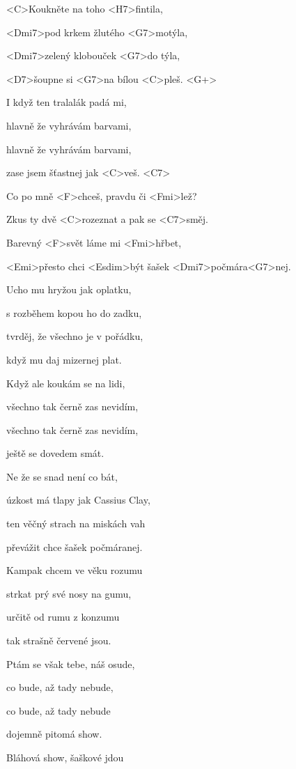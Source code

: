 

\zs
<C>Koukněte na toho <H7>fintila,

<Dmi7>pod krkem žlutého <G7>motýla,

<Dmi7>zelený klobouček <G7>do týla,

<D7>šoupne si <G7>na bílou <C>pleš. <G+>
\ks

\zs
I když ten tralalák padá mi,

hlavně že vyhrávám barvami,

hlavně že vyhrávám barvami,

zase jsem šťastnej jak <C>veš. <C7>
\ks

\zr
Co po mně <F>chceš, pravdu či <Fmi>lež?

Zkus ty dvě <C>rozeznat a pak se <C7>směj.

Barevný <F>svět láme mi <Fmi>hřbet,

<Emi>přesto chci <Esdim>být šašek <Dmi7>počmára<G7>nej.
\kr

\zs
Ucho mu hryžou jak oplatku,

s rozběhem kopou ho do zadku,

tvrděj, že všechno je v pořádku,

když mu daj mizernej plat.
\ks

\zs
Když ale koukám se na lidi,

všechno tak černě zas nevidím,

všechno tak černě zas nevidím,

ještě se dovedem smát.
\ks

\zr
Ne že se snad není co bát,

úzkost má tlapy jak Cassius Clay,

ten věčný strach na miskách vah

převážit chce šašek počmáranej.
\kr

\zs
Kampak chcem ve věku rozumu

strkat prý své nosy na gumu,

určitě od rumu z konzumu

tak strašně červené jsou.
\ks

\zs
Ptám se však tebe, náš osude,

co bude, až tady nebude,

co bude, až tady nebude

dojemně pitomá show.
\ks

\zr
Bláhová show, šaškové jdou

